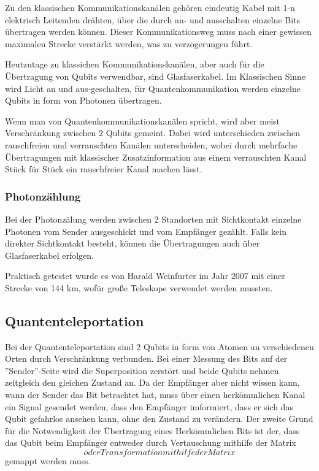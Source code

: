 Zu den klassischen Kommunikationskanälen gehören eindeutig Kabel mit 1-n elektrisch Leitenden drähten, über die durch an- und ausschalten einzelne Bits übertragen werden können. Dieser Kommunikationsweg muss nach einer gewissen maximalen Strecke verstärkt werden, was zu verzögerungen führt.

Heutzutage zu klassichen Kommunikationskanälen, aber auch für die Übertragung von Qubits verwendbar, sind Glasfaserkabel. Im Klassischen Sinne wird Licht an und aus-geschalten, für Quantenkommunikation werden einzelne Qubits in form von Photonen übertragen.

Wenn man von Quantenkommunikationskanälen spricht, wird aber meist Verschränkung zwischen 2 Qubits gemeint. Dabei wird unterschieden zwischen rauschfreien und verrauschten Kanälen unterscheiden, wobei durch mehrfache Übertragungen mit klassischer Zusatzinformation aus einem verrauschten Kanal Stück für Stück ein rauschfreier Kanal machen lässt.

\subsubsection{Photonzählung}
\label{sec:photonzaelung}

Bei der Photonzälung werden zwischen 2 Standorten mit Sichtkontakt einzelne Photonen vom Sender ausgeschickt und vom Empfänger gezählt. Falls kein direkter Sichtkontakt besteht, können die Übertragungen auch über Glasfaserkabel erfolgen.

Praktisch getestet wurde es von Harald Weinfurter im Jahr 2007 mit einer Strecke von 144 km, wofür große Teleskope verwendet werden mussten.

\subsection{Quantenteleportation}
\label{sec:quantenteleportation}

Bei der Quantenteleportation sind 2 Qubits in form von Atomen an verschiedenen Orten durch Verschränkung verbunden. Bei einer Messung des Bits auf der ''Sender''-Seite wird die Superposition zerstört und beide Qubits nehmen zeitgleich den gleichen Zustand an. Da der Empfänger aber nicht wissen kann, wann der Sender das Bit betrachtet hat, muss über einen herkömmlichen Kanal ein Signal gesendet werden, dass den Empfänger imformiert, dass er sich das Qubit gefahrlos ansehen kann, ohne den Zustand zu verändern. Der zweite Grund für die Notwendigkeit der Übertragung eines Herkömmlichen Bits ist der, dass das Qubit beim Empfänger entweder durch Vertauschung mithilfe der Matrix $$ oder Transformation mithilfe der Matrix $$ gemappt werden muss.

